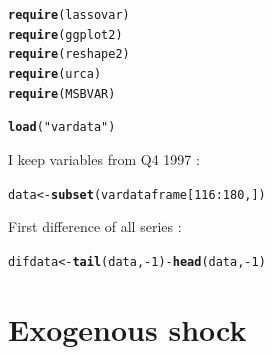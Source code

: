 \documentclass[11pt,oneside, a4paper]{amsart}\usepackage[]{graphicx}\usepackage[]{color}
\makeatletter
\newcommand{\hlnum}[1]{\textcolor[rgb]{0.686,0.059,0.569}{#1}}%
\newcommand{\hlstr}[1]{\textcolor[rgb]{0.192,0.494,0.8}{#1}}%
\newcommand{\hlopt}[1]{\textcolor[rgb]{0,0,0}{#1}}%
\newcommand{\hlstd}[1]{\textcolor[rgb]{0.345,0.345,0.345}{#1}}%
\newcommand{\hlkwb}[1]{\textcolor[rgb]{0.69,0.353,0.396}{#1}}%
\newcommand{\hlkwd}[1]{\textcolor[rgb]{0.737,0.353,0.396}{\textbf{#1}}}%
\newenvironment{kframe}{%
 \def\at@end@of@kframe{}%
 \ifinner\ifhmode%
  \def\at@end@of@kframe{\end{minipage}}%
  \begin{minipage}{\columnwidth}%
 \fi\fi%
 \def\FrameCommand##1{\hskip\@totalleftmargin \hskip-\fboxsep
 \colorbox{shadecolor}{##1}\hskip-\fboxsep
     \hskip-\linewidth \hskip-\@totalleftmargin \hskip\columnwidth}%
 \MakeFramed {\advance\hsize-\width
   \@totalleftmargin\z@ \linewidth\hsize
   \@setminipage}}%
 {\par\unskip\endMakeFramed%
 \at@end@of@kframe}
\newenvironment{knitrout}{}{} %
\makeatother
\begin{document}
\begin{knitrout}
\color{fgcolor}\begin{kframe}
\begin{alltt}
\hlkwd{require}\hlstd{(lassovar)}
\hlkwd{require}\hlstd{(ggplot2)}
\hlkwd{require}\hlstd{(reshape2)}
\hlkwd{require}\hlstd{(urca)}
\hlkwd{require}\hlstd{(MSBVAR)}
\end{alltt}
\end{kframe}
\end{knitrout}

\begin{knitrout}
\color{fgcolor}\begin{kframe}
\begin{alltt}
\hlkwd{load}\hlstd{(}\hlstr{"vardata"}\hlstd{)}
\end{alltt}
\end{kframe}
\end{knitrout}

I keep variables from Q4 1997 :
\begin{knitrout}
\color{fgcolor}\begin{kframe}
\begin{alltt}
\hlstd{data}\hlkwb{<-}\hlkwd{subset}\hlstd{(vardataframe[}\hlnum{116}\hlopt{:}\hlnum{180}\hlstd{,])}
\end{alltt}
\end{kframe}
\end{knitrout}

First difference of all series : 
\begin{knitrout}
\color{fgcolor}\begin{kframe}
\begin{alltt}
\hlstd{difdata} \hlkwb{<-} \hlkwd{tail}\hlstd{(data,}\hlopt{-}\hlnum{1}\hlstd{)} \hlopt{-} \hlkwd{head}\hlstd{(data,}\hlopt{-}\hlnum{1}\hlstd{)}
\end{alltt}
\end{kframe}
\end{knitrout}



\section*{Exogenous shock}
\end{document}
